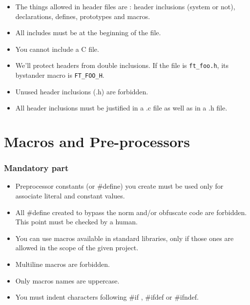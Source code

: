 \documentclass{42-en}
\begin{document}
            \begin{itemize}

                \item The things allowed in header files are :
                  header inclusions (system or not), declarations, defines,
                  prototypes and macros.

      			\item All includes must be at the beginning of the file.

                \item You cannot include a C file.

      			\item We'll protect headers from double inclusions. If the file is
                  \texttt{ft\_foo.h}, its bystander macro is \texttt{FT\_FOO\_H}.

      			\item Unused header inclusions (.h) are forbidden.

                \item All header inclusions must be justified in a .c file
                  as well as in a .h file.

            \end{itemize}


    \section{Macros and Pre-processors}

        \subsubsection{Mandatory part}

            \begin{itemize}

        	\item Preprocessor constants (or \#define) you create must be used
		  only for associate literal and constant values.
		\item All \#define created to bypass the norm and/or obfuscate
                  code are forbidden. This point must be checked by a human.
		\item You can use macros available in standard libraries, only
		  if those ones are allowed in the scope of the given project.
    		\item Multiline macros are forbidden.
    		\item Only macros names are uppercase.
		\item You must indent characters following \#if , \#ifdef
                  or \#ifndef.

            \end{itemize}
\end{document}
